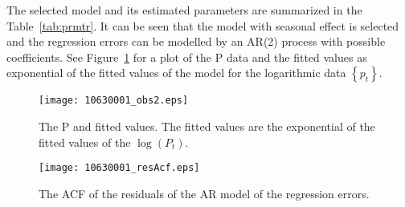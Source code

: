 \documentclass[a4paper,12pt]{article}
\begin{document}
The selected model and its estimated parameters are summarized in the Table~\ref{tab:prmtr}. It can be seen that the model with seasonal effect is selected and the regression errors can be modelled by an AR(2) process with possible coefficients. See Figure~\ref{fig:fitted} for a plot of the P data and the fitted values as exponential of the fitted values of the model for the logarithmic data $\left\{ p_t \right\}$.

\begin{table}
\centering
{}
\caption{Estimated parameters: each parameter are followed by a $95\%$ confidence interval. For
outliers, the time at which an outlier is identified precedes the estimate of its coefficient by a
colon.}
\label{tab:prmtr}
\end{table}


\begin{figure}[h]
\begin{center}
\texttt{[image: 10630001\_obs2.eps]}
\end{center}
\caption{The P and fitted values. The fitted values are the exponential of the fitted values of the $\log(P_t)$.} 
\label{fig:fitted}
\end{figure}

\begin{figure}[h]
\begin{center}
\texttt{[image: 10630001\_resAcf.eps]}
\end{center}
\caption{The ACF of the residuals of the AR model of the regression errors.} 
\label{fig:acf}
\end{figure}
\end{document}
